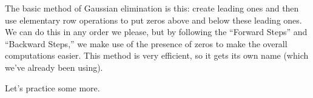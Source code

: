 

The basic method of Gaussian elimination is this: create leading ones and then use elementary row operations to put zeros above and below these leading ones. We can do this in any order we please, but by following the ``Forward Steps'' and ``Backward Steps,'' we make use of the presence of zeros to make the overall computations easier. This method is very efficient, so it gets its own name (which we've already been using).


Let's practice some more.\\

